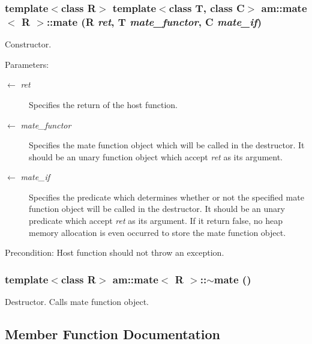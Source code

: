 \subsubsection{\setlength{\rightskip}{0pt plus 5cm}template$<$class R$>$ template$<$class T, class C$>$ {\bf am::mate}$<$ R $>$::{\bf mate} (R {\em ret}, T {\em mate\_\-functor}, C {\em mate\_\-if})\hspace{0.3cm}{\tt  [inline]}}\label{classam_1_1mate_0992eeb490ba954833e27e0935861b5a}


Constructor.

\begin{Desc}
\item[Parameters:]
\begin{description}
\item[\mbox{$\leftarrow$} {\em ret}]Specifies the return of the host function. \item[\mbox{$\leftarrow$} {\em mate\_\-functor}]Specifies the mate function object which will be called in the destructor. It should be an unary function object which accept {\em ret\/} as its argument. \item[\mbox{$\leftarrow$} {\em mate\_\-if}]Specifies the predicate which determines whether or not the specified mate function object will be called in the destructor. It should be an unary predicate which accept {\em ret\/} as its argument. If it return false, no heap memory allocation is even occurred to store the mate function object.\end{description}
\end{Desc}
\begin{Desc}
\item[Precondition:]Host function should not throw an exception. \end{Desc}
\subsubsection{\setlength{\rightskip}{0pt plus 5cm}template$<$class R$>$ {\bf am::mate}$<$ R $>$::$\sim${\bf mate} ()\hspace{0.3cm}{\tt  [inline]}}\label{classam_1_1mate_29cac99d41b0fb1cbd0be3e2c841444c}


Destructor. Calls mate function object. 

\subsection{Member Function Documentation}
